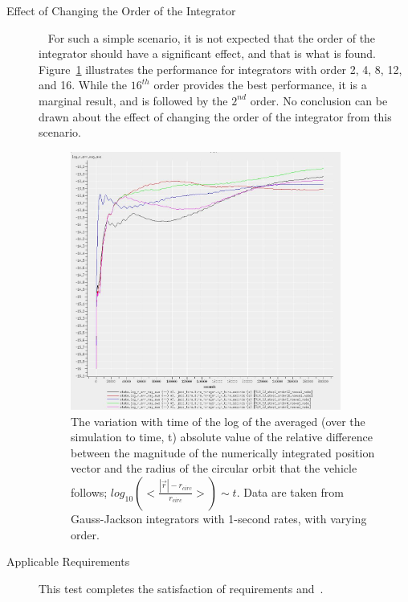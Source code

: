 \begin{description}
\item[Effect of Changing the Order of the Integrator]\ \newline
For such a simple scenario, it is not expected that the order of the 
integrator should have a significant effect, and that is what is found.  
Figure~\ref{fig:GJ_order_short_log} illustrates the performance for 
integrators with order 2, 4, 8, 12, and 16.  While the $16^{th}$ order 
provides the best performance, it is a marginal result, and is followed by 
the $2^{nd}$ order.  No conclusion can be drawn about the effect of changing 
the order of the integrator from this scenario.

\begin{figure}[!ht]
\centering
\includegraphics[width=3.5in]{figures/GJ_order_short.jpg}
\caption[Variation with Time of Orbital Position Error]
{The variation with time of the log of the averaged (over the 
simulation to time, t) absolute value of the relative difference between the 
magnitude of the numerically integrated position vector and the radius of the 
circular orbit that the vehicle follows; $log_{10} (<\frac{|\vec{r}| - 
r_{circ}}{r_{circ}}>) \sim t$.  Data are taken from Gauss-Jackson 
integrators with 1-second rates, with varying order.}
\label{fig:GJ_order_short_log}
\end{figure}

\item[Applicable Requirements]
This test completes the satisfaction of requirements
and~.

\end{description}

\clearpage

